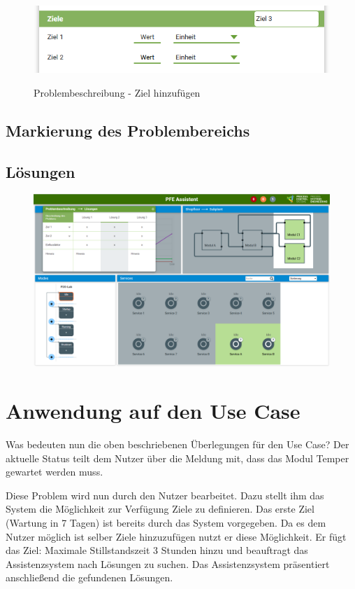 \begin{figure}[htbp]
\centering
\includegraphics[scale=0.7]{DA_files/Bilder/Konzept/Skizze-Problem-3.png}
\label{z}
\caption{Problembeschreibung - Ziel hinzufügen}
\end{figure}

\subsection{Markierung des Problembereichs}

\subsection{Lösungen}

\begin{figure}[htbp]
\centering
\includegraphics[angle=90,scale=0.47]{DA_files/Bilder/Konzept/Skizze-Loesungen-PFE.png}
\end{figure}

\section{Anwendung auf den Use Case}
Was bedeuten nun die oben beschriebenen Überlegungen für den Use Case? Der aktuelle Status teilt dem Nutzer über die Meldung mit, dass das Modul Temper gewartet werden muss. 

Diese Problem wird nun durch den Nutzer bearbeitet. Dazu stellt ihm das System die Möglichkeit zur Verfügung Ziele zu definieren. Das erste Ziel (Wartung in 7 Tagen) ist bereits durch das System vorgegeben. Da es dem Nutzer möglich ist selber Ziele hinzuzufügen nutzt er diese Möglichkeit. Er fügt das Ziel: Maximale Stillstandszeit 3 Stunden hinzu und beauftragt das Assistenzsystem nach Lösungen zu suchen. Das Assistenzsystem präsentiert anschließend die gefundenen Lösungen. 
